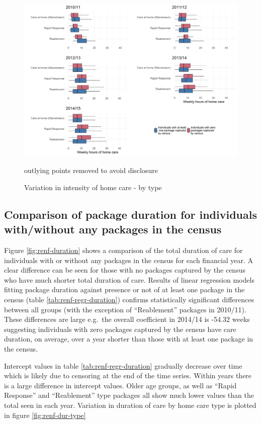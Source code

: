 \documentclass[]{article}
\begin{document}
\begin{figure}[]
  \centering
    \includegraphics{figures/chapter-renf/16-type-inten.png}
    \caption{Variation in intensity of home care - by type}
    {\scriptsize outlying points removed to avoid disclosure}
    \label{fig:renf-intensity-type}
\end{figure}

\FloatBarrier
\subsection{Comparison of package duration for individuals with/without any packages in the census}\label{subsec:renf-duration-diff}

Figure \ref{fig:renf-duration} shows a comparison of the total duration
of care for individuals with or without any packages in the census for
each financial year. A clear difference can be seen for those with no
packages captured by the census who have much shorter total duration of
care. Results of linear regression models fitting package duration
against presence or not of at least one package in the census (table
\ref{tab:renf-regr-duration}) confirms statistically significant
differences between all groups (with the exception of ``Reablement''
packages in 2010/11). These differences are large e.g.~the overall
coefficient in 2014/14 is -54.32 weeks suggesting individuals with zero
packages captured by the census have care duration, on average, over a
year shorter than those with at least one package in the census.

Intercept values in table \ref{tab:renf-regr-duration} gradually
decrease over time which is likely due to censoring at the end of the
time series. Within years there is a large difference in intercept
values. Older age groups, as well as ``Rapid Response'' and
``Reablement'' type packages all show much lower values than the total
seen in each year. Variation in duration of care by home care type is
plotted in figure \ref{fig:renf-dur-type}
\end{document}
